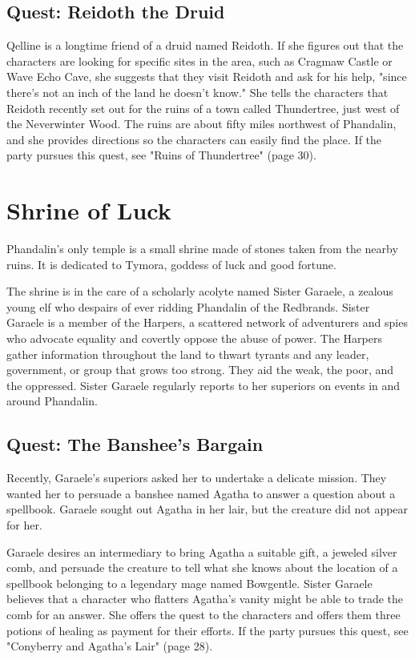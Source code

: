 \documentclass[10pt,a4paper,twoside,bg=print,twocolumn,openany,nodeprecatedcode]{dndbook}
\begin{document}
\subsection{Quest: Reidoth the Druid}
Qelline is a longtime friend of a druid named Reidoth. If she figures out that the characters are looking for specific sites in the area, such as Cragmaw Castle or Wave Echo Cave, she suggests that they visit Reidoth and ask for his help, "since there's not an inch of the land he doesn't know." She tells the characters that Reidoth recently set out for the ruins of a town called Thundertree, just west of the Neverwinter Wood. The ruins are about fifty miles northwest of Phandalin, and she provides directions so the characters can easily find the place. If the party pursues this quest, see "Ruins of Thundertree" (page 30).

\section{Shrine of Luck}
Phandalin's only temple is a small shrine made of stones taken from the nearby ruins. It is dedicated to Tymora, goddess of luck and good fortune.

The shrine is in the care of a scholarly acolyte named Sister Garaele, a zealous young elf who despairs of ever ridding Phandalin of the Redbrands. Sister Garaele is a member of the Harpers, a scattered network of adventurers and spies who advocate equality and covertly oppose the abuse of power. The Harpers gather information throughout the land to thwart tyrants and any leader, government, or group that grows too strong. They aid the weak, the poor, and the oppressed. Sister Garaele regularly reports to her superiors on events in and around Phandalin.

\subsection{Quest: The Banshee's Bargain}
Recently, Garaele's superiors asked her to undertake a delicate mission. They wanted her to persuade a banshee named Agatha to answer a question about a spellbook. Garaele sought out Agatha in her lair, but the creature did not appear for her.

Garaele desires an intermediary to bring Agatha a suitable gift, a jeweled silver comb, and persuade the creature to tell what she knows about the location of a spellbook belonging to a legendary mage named Bowgentle. Sister Garaele believes that a character who flatters Agatha's vanity might be able to trade the comb for an answer. She offers the quest to the characters and offers them three potions of healing as payment for their efforts. If the party pursues this quest, see "Conyberry and Agatha's Lair" (page 28).
\end{document}
